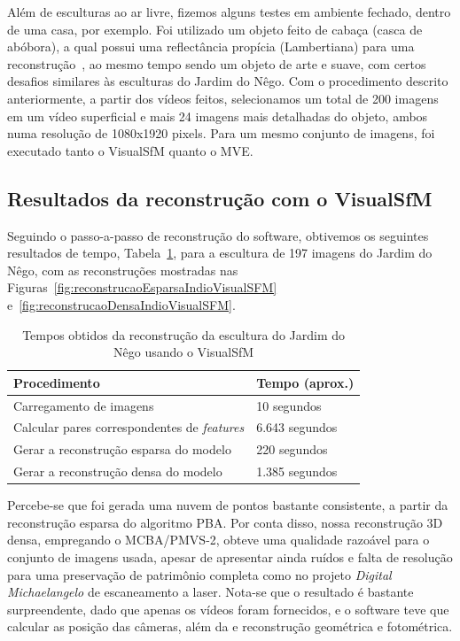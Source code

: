 Além de esculturas ao ar livre, fizemos alguns testes em ambiente fechado,
dentro de uma casa, por exemplo. Foi utilizado um objeto feito de cabaça (casca
de abóbora), a qual possui uma reflectância propícia
(Lambertiana) para uma reconstrução~\cite{basri2003lambertian}, ao mesmo tempo
sendo um objeto de arte e suave, com certos desafios similares às esculturas do
Jardim do Nêgo.  Com o procedimento descrito anteriormente, a partir dos vídeos
feitos, selecionamos um total de 200 imagens em um vídeo superficial e mais 24
imagens mais detalhadas do objeto, ambos numa resolução de 1080x1920 pixels. 
Para um mesmo conjunto de imagens, foi executado tanto o VisualSfM quanto o MVE.

\subsection{Resultados da reconstrução com o VisualSfM}

Seguindo o passo-a-passo de reconstrução do software, obtivemos os seguintes
resultados de tempo, Tabela~\ref{tab:temposSfMJardimDoNego}, para a escultura de
197 imagens do Jardim do Nêgo, com as reconstruções mostradas nas
Figuras~\ref{fig:reconstrucaoEsparsaIndioVisualSFM} e~\ref{fig:reconstrucaoDensaIndioVisualSFM}.

\begin{table}[h!]
\caption{Tempos obtidos da reconstrução da escultura do Jardim do Nêgo usando o VisualSfM}
\label{tab:temposSfMJardimDoNego}
\begin{tabular}{|l|p{4.7cm}|}
\hline
Procedimento & Tempo (aprox.) \\ \hline
Carregamento de imagens & 10 segundos \\ \hline
Calcular pares correspondentes de \emph{features} & 6.643 segundos \\ \hline
Gerar a reconstrução esparsa do modelo & 220 segundos \\ \hline
Gerar a reconstrução densa do modelo & 1.385 segundos \\ \hline
\end{tabular}
\end{table}

Percebe-se que foi gerada uma nuvem de pontos bastante consistente, a partir da
reconstrução esparsa do algoritmo PBA.  Por conta disso, nossa reconstrução 3D
densa, empregando o MCBA/PMVS-2, obteve uma qualidade razoável para o conjunto de
imagens usada, apesar de apresentar ainda ruídos e falta de resolução para uma
preservação de patrimônio completa como no projeto \emph{Digital Michaelangelo}
de escaneamento a laser. Nota-se que o resultado é bastante surpreendente, dado que
apenas os vídeos foram fornecidos, e o software teve que calcular as posição
das câmeras, além da e reconstrução geométrica e fotométrica.

